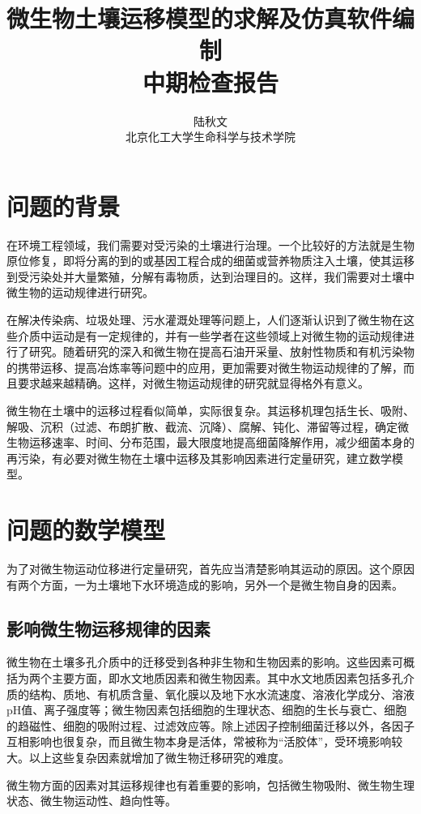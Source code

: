 \documentclass[a4paper,cs4size,adobefonts,fancyhdr]{ctexart}[2005/11/25]
\title{\heiti 微生物土壤运移模型的求解及仿真软件编制\\中期检查报告}
\author{\kaishu 陆秋文 \\ \kaishu 北京化工大学生命科学与技术学院}
\date{}
\numberwithin{equation}{section} %
\begin{document}

\setlength{\baselineskip}{22pt}
\section{问题的背景}
在环境工程领域，我们需要对受污染的土壤进行治理。一个比较好的方法就是生物原位修复，即将分离的到的或基因工程合成的细菌或营养物质注入土壤，使其运移到受污染处并大量繁殖，分解有毒物质，达到治理目的。这样，我们需要对土壤中微生物的运动规律进行研究。\par
在解决传染病、垃圾处理、污水灌溉处理等问题上，人们逐渐认识到了微生物在这些介质中运动是有一定规律的，并有一些学者在这些领域上对微生物的运动规律进行了研究。随着研究的深入和微生物在提高石油开采量、放射性物质和有机污染物的携带运移、提高冶炼率等问题中的应用，更加需要对微生物运动规律的了解，而且要求越来越精确。这样，对微生物运动规律的研究就显得格外有意义。\par
微生物在土壤中的运移过程看似简单，实际很复杂。其运移机理包括生长、吸附、解吸、沉积（过滤、布朗扩散、截流、沉降）、腐解、钝化、滞留等过程，确定微生物运移速率、时间、分布范围，最大限度地提高细菌降解作用，减少细菌本身的再污染，有必要对微生物在土壤中运移及其影响因素进行定量研究，建立数学模型。
\section{问题的数学模型}
为了对微生物运动位移进行定量研究，首先应当清楚影响其运动的原因。这个原因有两个方面，一为土壤地下水环境造成的影响，另外一个是微生物自身的因素。
\subsection{影响微生物运移规律的因素}
微生物在土壤多孔介质中的迁移受到各种非生物和生物因素的影响。这些因素可概括为两个主要方面，即水文地质因素和微生物因素。其中水文地质因素包括多孔介质的结构、质地、有机质含量、氧化膜以及地下水水流速度、溶液化学成分、溶液pH值、离子强度等；微生物因素包括细胞的生理状态、细胞的生长与衰亡、细胞的趋磁性、细胞的吸附过程、过滤效应等。除上述因子控制细菌迁移以外，各因子互相影响也很复杂，而且微生物本身是活体，常被称为“活胶体”，受环境影响较大。以上这些复杂因素就增加了微生物迁移研究的难度。\par
微生物方面的因素对其运移规律也有着重要的影响，包括微生物吸附、微生物生理状态、微生物运动性、趋向性等。
\end{document}
